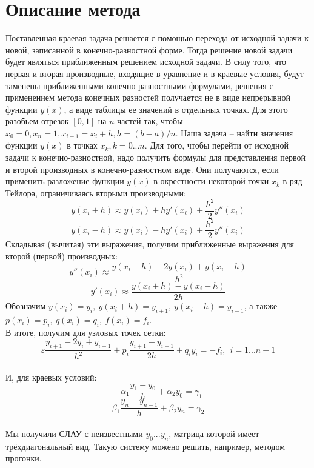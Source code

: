 \documentclass[a4paper,12pt]{extarticle}
\begin{document}
    \section{Описание метода}
    Поставленная краевая задача решается с помощью перехода от исходной задачи к новой, записанной в конечно-разностной форме. Тогда решение новой задачи будет являться приближенным решением исходной задачи. В силу того, что первая и вторая производные, входящие в уравнение и в краевые условия, будут заменены приближенными конечно-разностными формулами, решения с применением метода конечных разностей получается не в виде непрерывной функции $y(x)$, а виде таблицы ее значений в отдельных точках. Для этого разобьем отрезок $[0, 1]$ на $n$ частей  так, чтобы $x_0 = 0, x_n = 1, x_{i+1} = x_i + h, h = (b-a)/n$. Наша задача – найти значения функции $y(x)$ в точках $x_k, k=0...n$. Для того, чтобы перейти от исходной задачи к конечно-разностной, надо получить формулы для представления первой и второй производных в конечно-разностном виде. Они получаются, если применить разложение функции $y(x)$ в окрестности некоторой точки $x_k$ в ряд Тейлора, ограничиваясь вторыми производными:
    $$
    y(x_i + h) \approx y(x_i) + hy'(x_i) + \frac{h^2}{2}y''(x_i)
    $$
    $$
    y(x_i - h) \approx y(x_i) - hy'(x_i) + \frac{h^2}{2}y''(x_i)
    $$
    Складывая (вычитая) эти выражения, получим приближенные выражения для второй (первой) производных:
    $$
    y''(x_i) \approx \frac{y(x_i + h) - 2y(x_i) + y(x_i - h)}{h^2}
    $$
    $$
    y'(x_i) \approx \frac{y(x_i + h) - y(x_i - h)}{2h}
    $$
    Обозначим $y(x_i) = y_i,~ y(x_i +h) = y_{i+1},~ y(x_i -h) = y_{i-1}$, а также $p(x_i) = p_i, ~ q(x_i) = q_i, ~ f(x_i) = f_i$.\\
    В итоге, получим для узловых точек сетки:
    \begin{equation}
        \varepsilon \frac{y_{i+1} - 2y_i + y_{i-1}}{h^2} + p_i \frac{y_{i+1}-y_{i-1}}{2h} + q_i y_i = -f_i,  ~~ i = 1...n-1
    \end{equation}\\
    И, для краевых условий:
    \begin{equation}
        -\alpha_1\frac{y_{1}-y_{0}}{h} + \alpha_2 y_0 = \gamma_1
    \end{equation}
    \begin{equation}
        \beta_1\frac{y_{n}-y_{n-1}}{h} + \beta_2 y_n = \gamma_2
    \end{equation}\\
    Мы получили СЛАУ с неизвестными $y_0...y_n$, матрица которой имеет трёхдиагональный вид. Такую систему можено решить, например, методом прогонки.
    
\end{document}
